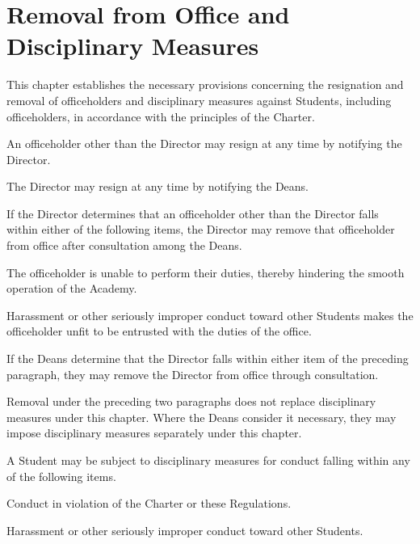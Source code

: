 \newpage
\chapter{Removal from Office and Disciplinary Measures}
\begin{articles}
  \item This chapter establishes the necessary provisions concerning the resignation and removal of officeholders and disciplinary measures against Students, including officeholders, in accordance with the principles of the Charter.
  \item An officeholder other than the Director may resign at any time by notifying the Director.
  \begin{paragraphs}
    \item The Director may resign at any time by notifying the Deans.
  \end{paragraphs}
  \item If the Director determines that an officeholder other than the Director falls within either of the following items, the Director may remove that officeholder from office after consultation among the Deans.
  \begin{subitems}
    \item The officeholder is unable to perform their duties, thereby hindering the smooth operation of the Academy.
    \item Harassment or other seriously improper conduct toward other Students makes the officeholder unfit to be entrusted with the duties of the office.
  \end{subitems}
  \begin{paragraphs}
    \item If the Deans determine that the Director falls within either item of the preceding paragraph, they may remove the Director from office through consultation.
    \item Removal under the preceding two paragraphs does not replace disciplinary measures under this chapter. Where the Deans consider it necessary, they may impose disciplinary measures separately under this chapter.
  \end{paragraphs}
  \item A Student may be subject to disciplinary measures for conduct falling within any of the following items.
  \begin{subitems}
    \item Conduct in violation of the Charter or these Regulations.
    \item Harassment or other seriously improper conduct toward other Students.

\end{subitems}
\end{articles}
